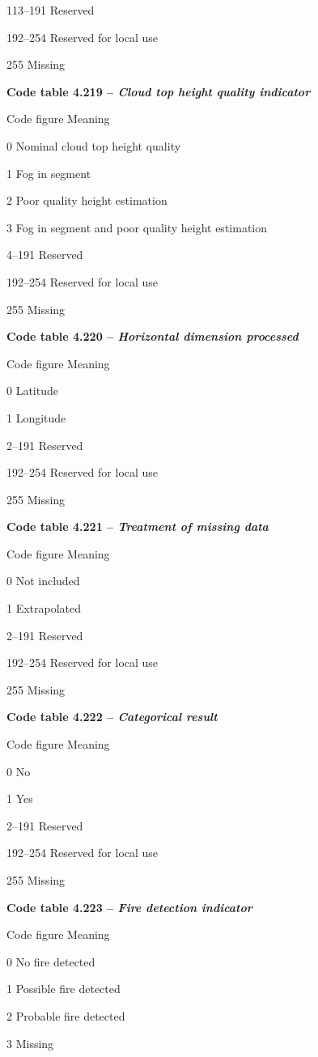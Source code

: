 113--191 Reserved

192--254 Reserved for local use

255 Missing

\textbf{Code table 4.219 -- \emph{Cloud top height quality indicator}}

Code figure Meaning

0 Nominal cloud top height quality

1 Fog in segment

2 Poor quality height estimation

3 Fog in segment and poor quality height estimation

4--191 Reserved

192--254 Reserved for local use

255 Missing

\textbf{Code table 4.220 -- \emph{Horizontal dimension processed}}

Code figure Meaning

0 Latitude

1 Longitude

2--191 Reserved

192--254 Reserved for local use

255 Missing

\textbf{Code table 4.221 -- \emph{Treatment of missing data}}

Code figure Meaning

0 Not included

1 Extrapolated

2--191 Reserved

192--254 Reserved for local use

255 Missing

\textbf{Code table 4.222 -- \emph{Categorical result}}

Code figure Meaning

0 No

1 Yes

2--191 Reserved

192--254 Reserved for local use

255 Missing

\textbf{Code table 4.223 -- \emph{Fire detection indicator}}

Code figure Meaning

0 No fire detected

1 Possible fire detected

2 Probable fire detected

3 Missing

\textbf{\\
}

